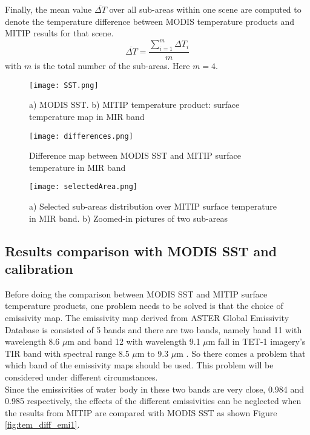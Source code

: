 \noindent Finally, the mean value $\overline{\Delta T}$ over all sub-areas within one scene are computed to denote the temperature difference between MODIS temperature products and MITIP results for that scene.\\
\begin{equation}
\label{eq1}
\overline{\Delta T} =\frac{\sum_{i=1}^m \Delta T_i}{m}
\end{equation}
with $m$ is the total number of the sub-areas. Here $m = 4$.

\begin{figure}[!htbp]
\centering\texttt{[image: SST.png]}
\caption{a) MODIS SST. b) MITIP temperature product: surface temperature map in MIR band}
\label{fig:SST}
\end {figure}

\begin{figure}[!htbp]
\centering\texttt{[image: differences.png]}
\caption{Difference map between MODIS SST and MITIP surface temperature in MIR band}
\label{fig:Diff}
\end{figure}

\begin{figure}[!htbp]
\centering\texttt{[image: selectedArea.png]}
\caption{a) Selected sub-areas distribution over MITIP surface temperature in MIR band. b) Zoomed-in pictures of two sub-areas}
\label{fig:selectedArea}
\end{figure}


\subsection{Results comparison with MODIS SST and calibration}
Before doing the comparison between MODIS SST and MITIP surface temperature products, one problem needs to be solved is that the choice of emissivity map. The emissivity map derived from ASTER Global Emissivity Database is consisted of 5 bands and there are two bands, namely band 11 with wavelength 8.6 $\mu$m and band 12 with wavelength 9.1 $\mu$m fall in TET-1 imagery's TIR band with spectral range 8.5 $\mu$m to 9.3 $\mu$m \parencite{Reference306}. So there comes a problem that which band of the emissivity maps should be used. This problem will be considered under different circumstances.\\

\noindent Since the emissivities of water body in these two bands are very close, 0.984  and 0.985 respectively, the effects of the different emissivities can be neglected when the results from MITIP are compared with MODIS SST as shown Figure \ref{fig:tem_diff_emi1}.\\

